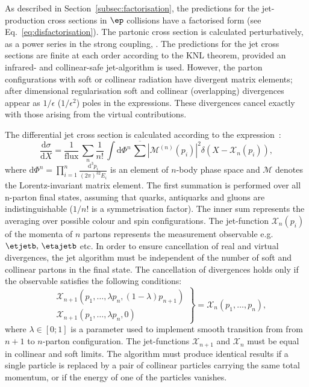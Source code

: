 As described in Section~\ref{subsec:factorisation}, the predictions for the jet-production cross sections in $\ep$ collisions have a factorised form (see Eq.~\eqref{eq:disfactorisation}). The partonic cross section is calculated perturbatively, as a power series in the strong coupling, \as. The predictions for the jet cross sections are finite at each order according to the KNL theorem\cite{Kinoshita:1962ur,Lee:1964is}, provided an infrared- and collinear-safe jet-algorithm is used. However, the parton configurations with soft or collinear radiation have divergent matrix elements; after dimensional regularisation soft and collinear (overlapping) divergences appear as $1/\epsilon$ ($1/\epsilon^2$) poles in the expressions. These divergences cancel exactly with those arising from the virtual contributions.

The differential jet cross section is calculated according to the expression~\cite{PDG:2014}:
\begin{equation}
\frac{\mathrm{d}\sigma}{\mathrm{d}X} = \frac{1}{\text{flux}}\, \sum_n{ \frac{1}{n!} \, \int{\mathrm{d}\Phi^{n}} \, \overline{\sum}{ \left| \mathcal{M}^{\left(n\right)}\left(p_i\right) \right|^2 } \delta\left( X - \mathcal{X}_n\left( p_i\right)\right)},
\label{eq:pqcdxs}
\end{equation}
where $\mathrm{d}\Phi^{n}=\prod_{i=1}^{n}\frac{\mathrm{d^3}p_i}{\left(2\pi\right)^32E_i}$ is an element of $n$-body phase space and $\mathcal{M}$ denotes the Lorentz-invariant matrix element. The first summation is performed over all n-parton final states, assuming that quarks, antiquarks and gluons are indistinguishable ($1/n!$ is a symmetrisation factor). The inner sum represents the averaging over possible colour and spin configurations. The jet-function $\mathcal{X}_n\left( p_i\right)$ of the momenta of $n$ partons represents the measurement observable e.g. $\etjetb,\,\etajetb$ etc. In order to ensure cancellation of real and virtual divergences, the jet algorithm must be independent of the number of soft and collinear partons in the final state. The cancellation of divergences holds only if the observable satisfies the following conditions:
\begin{equation}
\left.
\begin{aligned}
	&\mathcal{X}_{n+1}\left( p_1,\dots,\lambda p_n,\left(1-\lambda\right)p_{n+1}\right)\\
	&\mathcal{X}_{n+1}\left( p_1,\dots,\lambda p_n,0\right)
\end{aligned}
\right\} = \mathcal{X}_{n}\left( p_1,\dots, p_n\right),
\label{eq:}
\end{equation}
where $\lambda\in\left[0;1\right]$ is a parameter used to implement smooth transition from from $n+1$ to $n$-parton configuration. The jet-functions $\mathcal{X}_{n+1}$ and $\mathcal{X}_{n}$ must be equal in collinear and soft limits. The algorithm must produce identical results if a single particle is replaced by a pair of collinear particles carrying the same total momentum, or if the energy of one of the particles vanishes.

